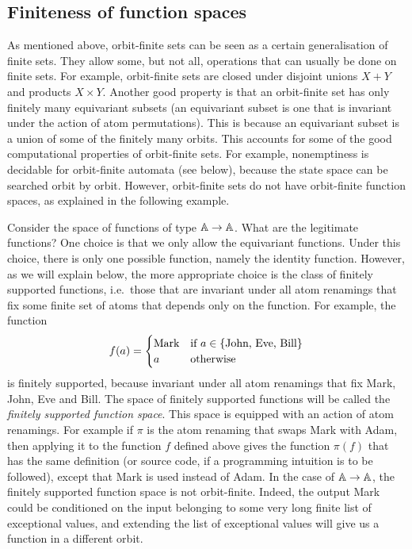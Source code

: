 
\subsection{Finiteness of function spaces}
\label{sec:orbit-finite-function-spaces}
As mentioned above, orbit-finite sets can be seen as  a certain generalisation of finite sets. They allow some, but not all, operations that can usually be done on finite sets. For example, orbit-finite sets are closed under disjoint unions $X + Y$ and products $X \times Y$.  Another good property is that an orbit-finite set has only finitely many equivariant subsets (an equivariant subset is one that is invariant under the action of atom permutations). This is because an equivariant subset is a union of some of the finitely many orbits. This accounts for some of the good computational properties of orbit-finite sets. For example, nonemptiness is decidable for orbit-finite automata (see below), because the state space can be searched orbit by orbit.
However, orbit-finite sets do not have orbit-finite function spaces, as explained in the following example. 

\begin{example}
    Consider the space of functions of type $\mathbb A \to \mathbb A$. What are the legitimate functions? One choice is that we only allow the equivariant functions. Under this choice, there is only one possible function,  namely the identity function. However, as we will explain below, the more appropriate choice is the class of finitely supported functions, i.e.~those that are invariant under all atom renamings that fix some finite set of atoms that depends only on the function. For example,  the  function
    \begin{align*}
    f(a) = \begin{cases}
        \text{Mark} & \text{if $a \in \{\text{John, Eve, Bill}\}$} \\
        a & \text{otherwise}
    \end{cases}
    \end{align*}
    is finitely supported, because invariant under all atom renamings that fix Mark, John, Eve and Bill. The space of finitely supported functions will be called the \emph{finitely supported function space}. This space is equipped with an action of atom renamings. For example if $\pi$ is the atom renaming that swaps Mark with Adam, then applying it to the function $f$ defined above gives the function $\pi(f)$ that has the same definition (or source code, if a programming intuition is to be followed), except that Mark is used instead of Adam.
    In the case of $\mathbb A \to \mathbb A$, the finitely supported function space is not orbit-finite. Indeed, the output Mark could be conditioned on the input belonging to some very long finite list of exceptional values, and extending the list of exceptional values will give us a function in a different orbit. \exampleend
\end{example}

